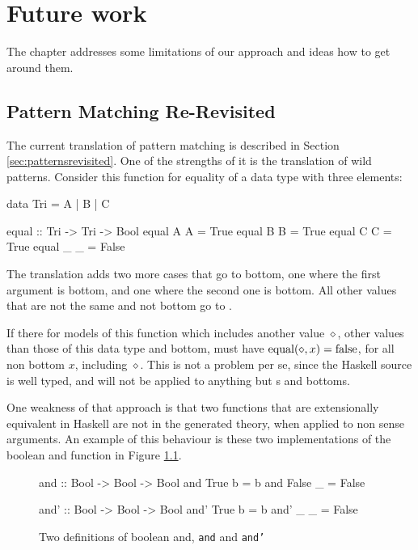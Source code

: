 \chapter{Future work}
\label{ch:future}

The chapter addresses some limitations of our approach and ideas how
to get around them.

\section{Pattern Matching Re-Revisited}
\label{sec:rerevisited}

The current translation of pattern matching is described in Section
\ref{sec:patternsrevisited}. One of the strengths of it is the
translation of wild patterns. Consider this function for equality of a
data type with three elements:

\begin{code}
data Tri = A | B | C

equal :: Tri -> Tri -> Bool
equal A A = True
equal B B = True
equal C C = True
equal _ _ = False
\end{code}

\noindent
The translation adds two more cases that go to bottom, one where the
first argument is bottom, and one where the second one is bottom. All
other values that are not the same  and not bottom go to
.

If there for models of this function which includes
another value $\diamond$, other values than those of this data type and
bottom, must have $\mathrm{equal}(\diamond,x) = \mathrm{false}$, for all non
bottom $x$, including $\diamond$. This is not a problem per se, since the
Haskell source is well typed, and  will not be applied to
anything but s and bottoms.

One weakness of that approach is that two functions that are
extensionally equivalent in Haskell are not in the generated theory,
when applied to non sense arguments. An example of this behaviour is
these two implementations of the boolean and function in Figure
\ref{code:and}.

\begin{figure}[h!]
\centering
\begin{minipage}[b]{6cm}
\begin{code}
and :: Bool -> Bool -> Bool
and True  b = b
and False _ = False
\end{code}
\end{minipage}
\hspace{10pt}
\begin{minipage}[b]{6cm}
\begin{code}
and' :: Bool -> Bool -> Bool
and' True  b = b
and' _     _ = False
\end{code}
\end{minipage}
\caption{Two definitions of boolean and, \texttt{and} and \texttt{and'}
\label{code:and}
}
\end{figure}

